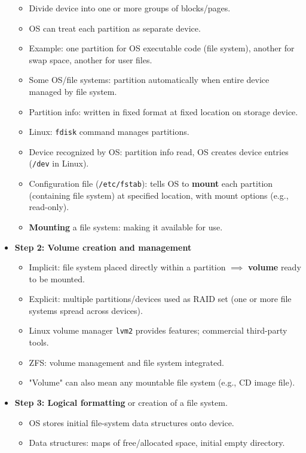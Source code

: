 \begin{itemize}
\begin{itemize}
        \item Divide device into one or more groups of blocks/pages.
        \item OS can treat each partition as separate device.
        \item Example: one partition for OS executable code (file system), another for swap space, another for user files.
        \item Some OS/file systems: partition automatically when entire device managed by file system.
        \item Partition info: written in fixed format at fixed location on storage device.
        \item Linux: \texttt{fdisk} command manages partitions.
        \item Device recognized by OS: partition info read, OS creates device entries (\texttt{/dev} in Linux).
        \item Configuration file (\texttt{/etc/fstab}): tells OS to \textbf{mount} each partition (containing file system) at specified location, with mount options (e.g., read-only).
        \item \textbf{Mounting} a file system: making it available for use.
    \end{itemize}
    \item \textbf{Step 2: Volume creation and management}
    \begin{itemize}
        \item Implicit: file system placed directly within a partition $\implies$ \textbf{volume} ready to be mounted.
        \item Explicit: multiple partitions/devices used as RAID set (one or more file systems spread across devices).
        \item Linux volume manager \texttt{lvm2} provides features; commercial third-party tools.
        \item ZFS: volume management and file system integrated.
        \item "Volume" can also mean any mountable file system (e.g., CD image file).
    \end{itemize}
    \item \textbf{Step 3: Logical formatting} or creation of a file system.
    \begin{itemize}
        \item OS stores initial file-system data structures onto device.
        \item Data structures: maps of free/allocated space, initial empty directory.

\end{itemize}
\end{itemize}
